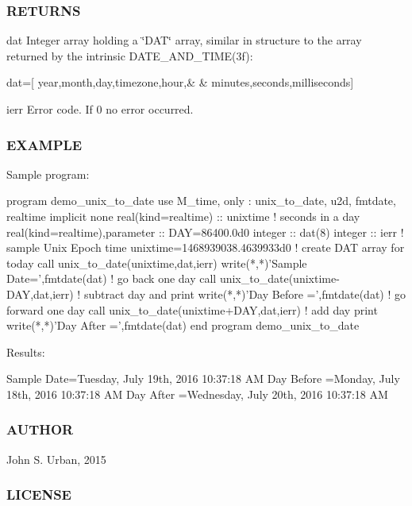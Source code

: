 \subsubsection*{R\+E\+T\+U\+R\+NS}

dat Integer array holding a \char`\"{}\+D\+A\+T\char`\"{} array, similar in structure to the array returned by the intrinsic D\+A\+T\+E\+\_\+\+A\+N\+D\+\_\+\+T\+I\+M\+E(3f)\+:

dat=\mbox{[} year,month,day,timezone,hour,\& \& minutes,seconds,milliseconds\mbox{]}

ierr Error code. If 0 no error occurred.

\subsubsection*{E\+X\+A\+M\+P\+LE}

\begin{DoxyVerb} Sample program:

  program demo_unix_to_date
  use M_time, only : unix_to_date, u2d, fmtdate, realtime
  implicit none
  real(kind=realtime)           :: unixtime
  ! seconds in a day
  real(kind=realtime),parameter :: DAY=86400.0d0
  integer                       :: dat(8)
  integer                       :: ierr
     ! sample Unix Epoch time
     unixtime=1468939038.4639933d0
     ! create DAT array for today
     call unix_to_date(unixtime,dat,ierr)
     write(*,*)'Sample Date=',fmtdate(dat)
     ! go back one day
     call unix_to_date(unixtime-DAY,dat,ierr)
     ! subtract day and print
     write(*,*)'Day Before =',fmtdate(dat)
     ! go forward one day
     call unix_to_date(unixtime+DAY,dat,ierr)
     ! add day print
     write(*,*)'Day After  =',fmtdate(dat)
  end program demo_unix_to_date

Results:

 Sample Date=Tuesday, July 19th, 2016 10:37:18 AM
 Day Before =Monday, July 18th, 2016 10:37:18 AM
 Day After  =Wednesday, July 20th, 2016 10:37:18 AM
\end{DoxyVerb}


\subsubsection*{A\+U\+T\+H\+OR}

John S. Urban, 2015 \subsubsection*{L\+I\+C\+E\+N\+SE}

